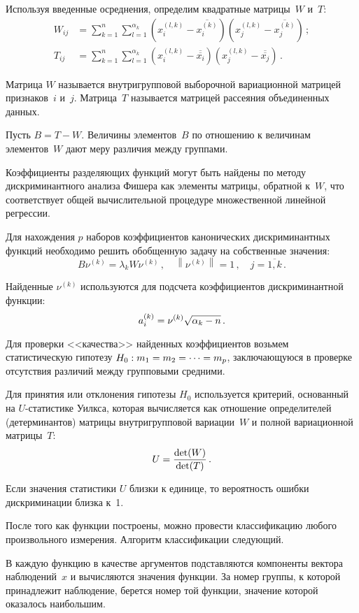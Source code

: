 \begin{multicols}{2}
Используя введенные осреднения, определим квадратные матрицы~$W$ и~$T$:
\begin{align*}
W_{ij}&= \sum\limits_{k=1}^n\sum\limits_{l=1}^{\alpha_k}{(x_i^{(l,k)} -
\overline{x_i^{(k)}} )( x_j^{(l,k)} - \overline{x_j^{(k)}})} \,;\\
T_{ij}&= \sum_{k=1}^n\sum_{l=1}^{\alpha_k}{(x_i^{(l,k)} -
\overline{\overline{x_i}} )( x_j^{(l,k)} -
\overline{\overline{x_j}})} \,.
\end{align*}

Матрица $W$ называется внутригрупповой выборочной вариационной
матрицей признаков~$i$ и~$j$. Матрица~$T$ называется матрицей
рассеяния объединенных данных.

Пусть $B = T - W$. Величины элементов~$B$ по отношению к величинам
элементов~$W$ дают меру различия между группами.

Коэффициенты разделяющих функций могут быть найдены по методу
дискриминантного анализа Фишера как элементы матрицы, обратной к~$W$, 
что соответствует общей вычислительной процедуре множественной линейной регрессии.

Для нахождения $p$ наборов коэффициентов канонических
дискриминантных функций необходимо решить обобщенную задачу на
собственные значения:
$$
B \nu^{(k)} = \lambda_k W \nu^{(k)} \,,\quad \left\| \nu^{(k)} \right\| = 1\,,\quad
 j=\overline{1,k}\,.
$$

Найденные $\nu^{(k)}$ используются для подсчета коэффициентов дискриминантной функции:
$$
a_i^{(k)}\hm= \nu^{(k)} \sqrt{\alpha_k - n}\,.
$$

Для проверки <<качества>> найденных коэффициентов  возьмем
статистическую гипотезу $H_0 : m_1 \hm= m_2 \hm= \cdots\hm = m_p$,
заключающуюся в проверке отсутствия различий между групповыми средними.

Для принятия или отклонения гипотезы $H_0$ используется
критерий, основанный на  $U$-ста\-ти\-сти\-ке Уилкса, которая
вычисляется как отношение определителей (детерминантов) матрицы
внутригрупповой вариации~$W$ и полной вариационной матрицы~$T$:
$$
U = \displaystyle\frac{\displaystyle \det(W)\mathstrut}{\displaystyle \det(T)\mathstrut}\,.
$$

Если значения статистики $U$ близки к единице, то вероятность ошибки дискриминации близка к~1.

После того как функции построены, можно провести классификацию любого
произвольного измерения. Алгоритм классификации следующий.

В каждую функцию в качестве аргументов подставляются компоненты вектора наблюдений~$x$ 
и вычисляются значения функции. За номер группы, к которой
принадлежит наблюдение, берется номер той функции, значение которой оказалось наибольшим.


\end{multicols}
